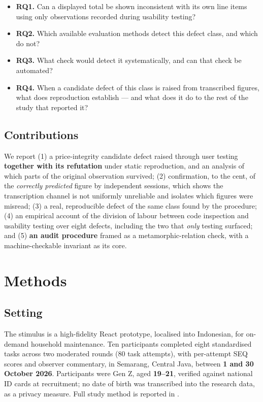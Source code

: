 \documentclass[conference]{IEEEtran}
\begin{document}
\begin{itemize}
\item \textbf{RQ1.} Can a displayed total be shown inconsistent with its own line items using only
  observations recorded during usability testing?
\item \textbf{RQ2.} Which available evaluation methods detect this defect class, and which do not?
\item \textbf{RQ3.} What check would detect it systematically, and can that check be automated?
\item \textbf{RQ4.} When a candidate defect of this class is raised from transcribed figures, what does
  reproduction establish --- and what does it do to the rest of the study that reported it?
\end{itemize}

\subsection{Contributions}

We report (1) a price-integrity candidate defect raised through user testing \textbf{together with its
refutation} under static reproduction, and an analysis of which parts of the original observation
survived; (2) confirmation, to the cent, of the \emph{correctly predicted} figure by independent
sessions, which shows the transcription channel is not uniformly unreliable and isolates which figures
were misread; (3) a real, reproducible defect of the same class found by the procedure; (4) an
empirical account of the division of labour between code inspection and usability testing over eight
defects, including the two that \emph{only} testing surfaced; and (5) \textbf{an audit procedure} framed
as a metamorphic-relation check, with a machine-checkable invariant as its core.

\section{Methods}

\subsection{Setting}

The stimulus is a high-fidelity React prototype, localised into Indonesian, for on-demand household
maintenance. Ten participants completed eight standardised tasks across two moderated rounds (80 task
attempts), with per-attempt SEQ scores and observer commentary, in Semarang, Central Java, between
\textbf{1 and 30 October 2026}. Participants were Gen Z, aged \textbf{19--21}, verified against national
ID cards at recruitment; no date of birth was transcribed into the research data, as a privacy measure.
Full study method is reported in \cite{braniwati2026dispersion}.
\end{document}
